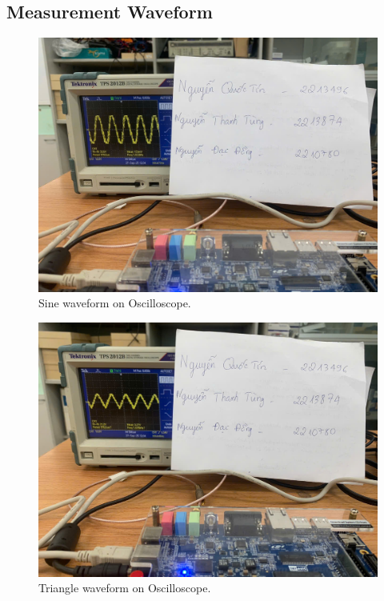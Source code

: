 \subsection{Measurement Waveform}

\begin{figure}[H]
	\centering
	\includegraphics[width=.9\linewidth]{./my-chapters/my-images/Gen_wave/hinh2.jpg}
	\caption{Sine waveform on Oscilloscope.}
\end{figure}

\begin{figure}[H]
	\centering
	\includegraphics[width=.9\linewidth]{./my-chapters/my-images/Gen_wave/hinh5.jpg}
	\caption{Triangle waveform on Oscilloscope.}
\end{figure}

